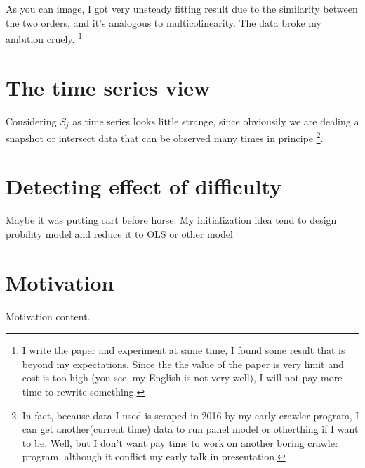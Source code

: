 \documentclass{article}
\begin{document}
As you can image, I got very unsteady fitting result due to the similarity between the two orders, and it's analogous
to multicolinearity. The data broke my ambition cruely. \footnote{I write the paper and experiment at same time,
I found some result that is beyond my expectations. Since the the value of the paper is very limit and cost is too high
(you see, my English is not very well), I will not pay more time to rewrite something.}

\section{The time series view}

Considering $S_j$ as time series looks little strange, since obviousily we are dealing a snapshot or intersect data
that can be observed many times in principe \footnote{In fact, because data I used is scraped in 2016 by my early
crawler program, I can get another(current time) data to run panel model or otherthing if I want to be. Well, 
but I don't want pay time to work on another boring crawler program, although it conflict my early talk 
in presentation.}.


\section{Detecting effect of difficulty}

Maybe it was putting cart before horse. My initialization idea tend to design probility model and reduce it to 
OLS or other model

\section{Motivation}

Motivation content.
\end{document}
